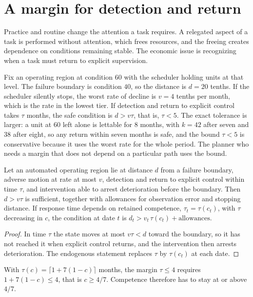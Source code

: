 \section{A margin for detection and return}

Practice and routine change the attention a task requires. A relegated aspect of a task is performed without attention, which frees resources, and the freeing creates dependence on conditions remaining stable. The economic issue is recognizing when a task must return to explicit supervision.

Fix an operating region at condition $60$ with the scheduler holding units at that level. The failure boundary is condition $40$, so the distance is $d=20$ tenths. If the scheduler silently stops, the worst rate of decline is $v=4$ tenths per month, which is the rate in the lowest tier. If detection and return to explicit control takes $\tau$ months, the safe condition is $d>v\tau$, that is, $\tau<5$. The exact tolerance is larger: a unit at $60$ left alone is lettable for $8$ months, with $k=42$ after seven and $38$ after eight, so any return within seven months is safe, and the bound $\tau<5$ is conservative because it uses the worst rate for the whole period. The planner who needs a margin that does not depend on a particular path uses the bound.

\begin{theorem}\label{thm:P16}
Let an automated operating region lie at distance $d$ from a failure boundary, adverse motion at rate at most $v$, detection and return to explicit control within time $\tau$, and intervention able to arrest deterioration before the boundary. Then $d>v\tau$ is sufficient, together with allowances for observation error and stopping distance. If response time depends on retained competence, $\tau_t=\tau(c_t)$, with $\tau$ decreasing in $c$, the condition at date $t$ is $d_t>v_t\,\tau(c_t)+\text{allowances}$.
\end{theorem}

\begin{proof}
In time $\tau$ the state moves at most $v\tau<d$ toward the boundary, so it has not reached it when explicit control returns, and the intervention then arrests deterioration. The endogenous statement replaces $\tau$ by $\tau(c_t)$ at each date.
\end{proof}

With $\tau(c)=\lceil 1+7(1-c)\rceil$ months, the margin $\tau\le 4$ requires $1+7(1-c)\le 4$, that is $c\ge 4/7$. Competence therefore has to stay at or above $4/7$.

